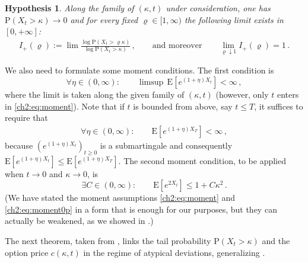 \documentclass[a4paper,reqno,11pt]{amsart}
\numberwithin{equation}{section}
\newtheorem{hypothesis}[theorem]{Hypothesis}
\newcommand{\PEfont}{\mathrm}
\renewcommand{\P}{\ensuremath{\PEfont P}}
\newcommand{\E}{\ensuremath{\PEfont E}}
\renewcommand{\rho}{\varrho}
\begin{document}
\begin{hypothesis}\label{ch2:ass:rv}
Along the family of $(\kappa,t)$ under consideration,
one has $\P(X_t>\kappa)\to 0$ and for every fixed $\rho \in [1,\infty)$ 
the following limit exists in $[0,+\infty]$:
\begin{equation} \label{ch2:eq:rv}
\begin{split}
	I_+(\rho) := \lim \frac{\log \P(X_t >\rho\kappa)}{\log \P(X_t > \kappa)} \,,
	\qquad \text{and moreover} \qquad \lim_{\rho\downarrow 1} I_+(\rho) = 1 \,.
\end{split}
\end{equation}
\end{hypothesis}

\noindent
We also need to formulate some moment conditions.
The first condition is
\begin{equation}\label{ch2:eq:moment}
	\forall \eta \in (0,\infty): \qquad \limsup\, \E[e^{(1+\eta)X_t}] < \infty \,,
   \end{equation}
where the limit is taken along the given family of $(\kappa,t)$
(however, only $t$ enters in \eqref{ch2:eq:moment}).
Note that if $t$ is bounded from above, say $t \le T$, it suffices
to require that
\begin{gather} \label{ch2:eq:momentsimple}
	\forall \eta \in (0,\infty): \qquad\E[e^{(1+\eta)X_T}] < \infty \,,
\end{gather}
because $(e^{(1+\eta)X_t})_{t\ge 0}$ is a submartingale
and consequently $\E[e^{(1+\eta)X_t}] \le \E[e^{(1+\eta)X_T}]$.
The second moment condition, to be applied 
when $t \to 0$ and $\kappa \to 0$, is
\begin{equation}\label{ch2:eq:moment0p}
	\exists C \in (0,\infty): \qquad
\E [e^{2 X_t} ] \le 1 + C \kappa^2 \,.
\end{equation}
\noindent
(We have stated the moment assumptions \eqref{ch2:eq:moment}
and \eqref{ch2:eq:moment0p} in a form that is enough for our purposes, but
they can actually be weakened, 
as we showed in \cite{cf:CC}.)

The next theorem, taken from \cite[Theorem 2.3]{cf:CC},
links the tail probability $\P(X_t > \kappa)$ and the option price $c(\kappa,t)$
in the regime of atypical deviations, generalizing \cite{cf:BF}.
\end{document}
